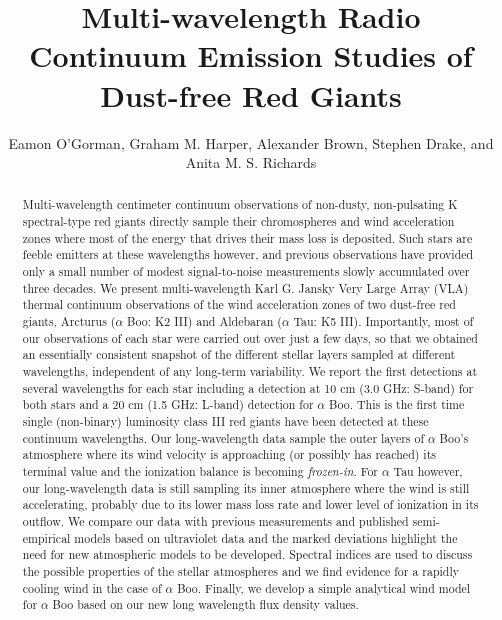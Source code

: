 \documentclass[iop]{emulateapj}
\begin{document}
\title{Multi-wavelength Radio Continuum Emission Studies of Dust-free Red Giants}


\author{Eamon O'Gorman, Graham M. Harper, Alexander Brown, Stephen Drake, and Anita M. S. Richards}



\begin{abstract}

Multi-wavelength centimeter continuum observations of non-dusty, non-pulsating K spectral-type red giants directly sample their chromospheres and wind acceleration zones where most of the energy that drives their mass loss is deposited. Such stars are feeble emitters at these wavelengths however, and previous observations have provided only a small number of modest signal-to-noise measurements slowly accumulated over three decades. We present multi-wavelength Karl G. Jansky Very Large Array (VLA) thermal continuum observations of the wind acceleration zones of two dust-free red giants, Arcturus ($\alpha$ Boo: K2 III) and Aldebaran ($\alpha$ Tau: K5 III). Importantly, most of our observations of each star were carried out over just a few days, so that we obtained an essentially consistent snapshot of the different stellar layers sampled at different wavelengths, independent of any long-term variability. We report the first detections at several wavelengths for each star including a detection at 10 cm (3.0 GHz: S-band) for both stars and a 20 cm (1.5 GHz: L-band) detection for $\alpha$ Boo. This is the first time single (non-binary) luminosity class III red giants have been detected at these continuum wavelengths. Our long-wavelength data sample the outer layers of $\alpha$ Boo's atmosphere where its wind velocity is approaching (or possibly has reached) its terminal value and the ionization balance is becoming \textit{frozen-in}. For $\alpha$ Tau however, our long-wavelength data is still sampling its inner atmosphere where the wind is still accelerating, probably due to its lower mass loss rate and lower level of ionization in its outflow. We compare our data with previous measurements and published semi-empirical models based on ultraviolet data and the marked deviations highlight the need for new atmospheric models to be developed. Spectral indices are used to discuss the possible properties of the stellar atmospheres and we find evidence for a rapidly cooling wind in the case of $\alpha$ Boo. Finally, we develop a simple analytical wind model for $\alpha$ Boo based on our new long wavelength flux density values.

\end{abstract}
\end{document}
